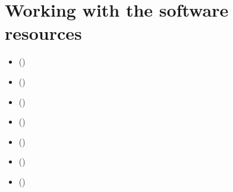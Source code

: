 \documentclass[a4paper,12pt,english]{sphinxhowto}
\begin{document}
\section{Working with the  software resources}
\label{\detokenize{tutorial:working-with-the-digraph3-software-resources}}\label{\detokenize{tutorial:digraphs-tutorial-label}}
\begin{sphinxShadowBox}
\begin{itemize}
\item {} 
\label{\detokenize{tutorial:id229}}{\hyperref[\detokenize{tutorial:purpose}]{}} ()

\item {} 
\label{\detokenize{tutorial:id230}}{\hyperref[\detokenize{tutorial:downloading-of-the-digraph3-resources}]{}} ()

\item {} 
\label{\detokenize{tutorial:id231}}{\hyperref[\detokenize{tutorial:starting-a-python3-session}]{}} ()

\item {} 
\label{\detokenize{tutorial:id232}}{\hyperref[\detokenize{tutorial:digraph-object-structure}]{}} ()

\item {} 
\label{\detokenize{tutorial:id233}}{\hyperref[\detokenize{tutorial:permanent-storage}]{}} ()

\item {} 
\label{\detokenize{tutorial:id234}}{\hyperref[\detokenize{tutorial:inspecting-a-digraph-object}]{}} ()

\item {} 
\label{\detokenize{tutorial:id235}}{\hyperref[\detokenize{tutorial:special-classes}]{}} ()

\end{itemize}
\end{sphinxShadowBox}
\end{document}
